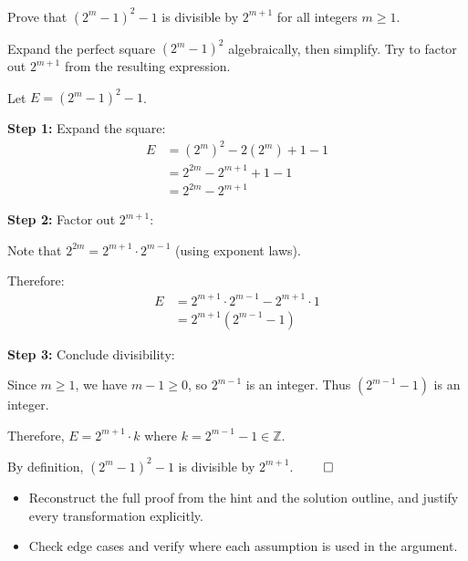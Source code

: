 
\begin{problem}
Prove that $(2^m - 1)^2 - 1$ is divisible by $2^{m+1}$ for all integers $m \geq 1$.
\end{problem}

\begin{hint}
Expand the perfect square $(2^m - 1)^2$ algebraically, then simplify. Try to factor out $2^{m+1}$ from the resulting expression.
\end{hint}

\begin{solution}
Let $E = (2^m - 1)^2 - 1$.

\textbf{Step 1:} Expand the square:
\begin{align*}
E &= (2^m)^2 - 2(2^m) + 1 - 1 \\
&= 2^{2m} - 2^{m+1} + 1 - 1 \\
&= 2^{2m} - 2^{m+1}
\end{align*}

\textbf{Step 2:} Factor out $2^{m+1}$:

Note that $2^{2m} = 2^{m+1} \cdot 2^{m-1}$ (using exponent laws).

Therefore:
\begin{align*}
E &= 2^{m+1} \cdot 2^{m-1} - 2^{m+1} \cdot 1 \\
&= 2^{m+1}(2^{m-1} - 1)
\end{align*}

\textbf{Step 3:} Conclude divisibility:

Since $m \geq 1$, we have $m - 1 \geq 0$, so $2^{m-1}$ is an integer. Thus $(2^{m-1} - 1)$ is an integer.

Therefore, $E = 2^{m+1} \cdot k$ where $k = 2^{m-1} - 1 \in \mathbb{Z}$.

By definition, $(2^m - 1)^2 - 1$ is divisible by $2^{m+1}$. $\qed$
\end{solution}

\begin{takeaways}
\begin{itemize}[leftmargin=*]
\item Reconstruct the full proof from the hint and the solution outline, and justify every transformation explicitly.
\item Check edge cases and verify where each assumption is used in the argument.
\end{itemize}
\end{takeaways}
